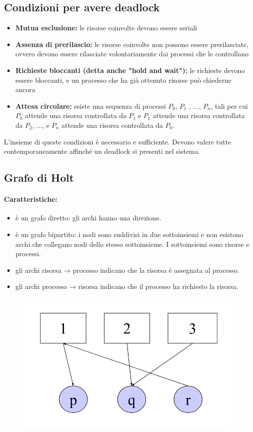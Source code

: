 \subsection{Condizioni per avere deadlock}
\begin{itemize}
    \item \textbf{Mutua esclusione:} le risorse coinvolte devono essere seriali
    \item \textbf{Assenza di prerilascio:} le risorse coinvolte non possono essere prerilasciate, ovvero devono essere rilasciate volontariamente dai processi che le controllano
    \item \textbf{Richieste bloccanti (detta anche "hold and wait"):} le richieste devono essere bloccanti, e un processo che ha già ottenuto risorse può chiederne ancora
    \item \textbf{Attesa circolare:} esiste una sequenza di processi $P_0$, $P_1$ , ..., $P _n$, tali per cui $P_0$ attende una risorsa controllata da $P_1$ e $P_1$ attende una risorsa controllata da $P_2$, ..., e $P_n$ attende una risorsa controllata da $P_0$.
\end{itemize}


L'insieme di queste condizioni è necessario e sufficiente. 
Devono valere tutte contemporaneamente affinché un deadlock si presenti nel sistema.

\subsection{Grafo di Holt}

\paragraph{Caratteristiche:} 
\begin{itemize}
    \item è un grafo diretto: gli archi hanno una direzione.
    \item è un grafo bipartito: i nodi sono suddivisi in due sottoinsiemi e non esistono archi che collegano nodi dello stesso sottoinsieme. I sottoinsiemi sono risorse e processi.
    \item gli archi risorsa → processo indicano che la risorsa è assegnata al processo.
    \item gli archi processo → risorsa indicano che il processo ha richiesto la risorsa.
\end{itemize}

\begin{figure}[h]
    \centering
    \includegraphics[width=0.4\linewidth]{Images/Screenshot 2024-12-30 at 18-00-42 so-04-risorse - so-04-risorse.pdf.png}
\end{figure}

